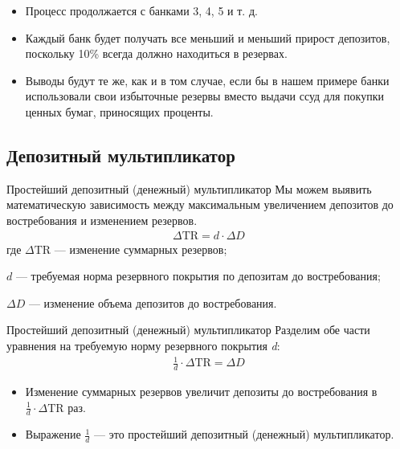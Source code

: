 \documentclass[_DKB_p1_Money.tex]{subfiles}
\begin{document}
\begin{frame}
\begin{itemize}
\item
Процесс продолжается с банками 3, 4, 5 и т. д. 

\item
Каждый банк будет получать все меньший и меньший прирост депозитов, поскольку 10\% всегда должно находиться в резервах.

\item
Выводы будут те же, как и в том случае, если бы в нашем примере банки использовали свои избыточные резервы вместо выдачи ссуд для покупки ценных бумаг, приносящих проценты.
\end{itemize}
\end{frame}

\subsection{Депозитный мультипликатор}
\begin{frame}{\setfontsize{12pt}Простейший депозитный (денежный) мультипликатор}
Мы можем выявить математическую зависимость между максимальным увеличением депозитов до востребования и изменением резервов.
\begin{align}
\Delta \text{TR}=d \cdot \Delta D
\end{align}
где $\Delta \text{TR}$ — изменение суммарных резервов;

$d$ — требуемая норма резервного покрытия по депозитам до востребования; 

$\Delta D$ — изменение объема депозитов до востребования.
\end{frame}

\begin{frame}{Простейший депозитный (денежный) мультипликатор}
Разделим обе части уравнения на требуемую норму резервного покрытия \textit{d}:
\begin{align}
\frac{1}{d}\cdot \Delta \text{TR}=\Delta D
\end{align}

\begin{itemize}
\item
Изменение суммарных резервов увеличит депозиты до востребования в $\frac{1}{d}\cdot \Delta \text{TR}$ раз. 

\item
Выражение $\frac{1}{d}$ — это простейший депозитный (денежный) мультипликатор. 
\end{itemize}
\end{frame}
\end{document}
